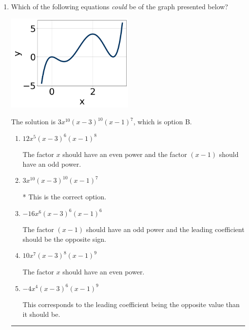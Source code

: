 \documentclass{extbook}[14pt]
\newcommand{\litem}[1]{\item #1

\rule{\textwidth}{0.4pt}}
\begin{document}
\begin{enumerate}\litem{
Which of the following equations \textit{could} be of the graph presented below?

\begin{center}
    \includegraphics[width=0.5\textwidth]{../Figures/polyGraphToFunctionCopyA.png}
\end{center}


The solution is \( 3x^{10} (x - 3)^{10} (x - 1)^{7} \), which is option B.\begin{enumerate}[label=\Alph*.]
\item \( 12x^{5} (x - 3)^{6} (x - 1)^{8} \)

The factor $x$ should have an even power and the factor $(x - 1)$ should have an odd power.
\item \( 3x^{10} (x - 3)^{10} (x - 1)^{7} \)

* This is the correct option.
\item \( -16x^{6} (x - 3)^{6} (x - 1)^{6} \)

The factor $(x - 1)$ should have an odd power and the leading coefficient should be the opposite sign.
\item \( 10x^{7} (x - 3)^{8} (x - 1)^{9} \)

The factor $x$ should have an even power.
\item \( -4x^{4} (x - 3)^{6} (x - 1)^{9} \)

This corresponds to the leading coefficient being the opposite value than it should be.
\end{enumerate}

}
\end{enumerate}
\end{document}
